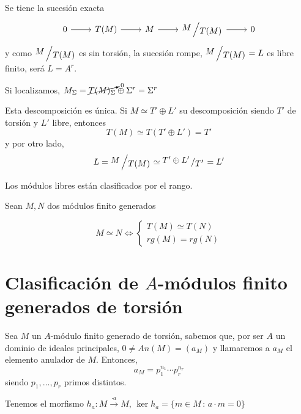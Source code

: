 \begin{dem}
    Se tiene la sucesi\'on exacta
    $$\bt 0 \rar & T(M) \rar & M \rar & \modulo{M}{T(M)} \rar & 0 \et$$
    y como $\modulo{M}{T(M)}$ es sin torsi\'on, la sucesi\'on rompe, $\modulo{M}{T(M)} = L$ es libre finito, ser\'a $L = A^r$.

    Si localizamos, $M_{\Sigma} = \cancelto{0}{T(M)_{\Sigma}} \oplus \Sigma^r  = \Sigma^r $

    Esta descomposición es única. Si $M\simeq T' \oplus L'$ su descomposici\'on siendo $T'$ de torsi\'on y $L'$ libre, entonces
    $$T(M) \simeq T(T'\oplus L') = T' $$
    y por otro lado, 
    $$L = \modulo{M}{T(M)} \simeq \modulo{T'\oplus L'}{T'} = L'$$
 \end{dem}
 \begin{obs}
 Los m\'odulos libres est\'an clasificados por el rango. 
 \end{obs}

Sean $M, N$ dos m\'odulos finito generados
 \begin{teo}
    [de clasificaci\'on] $$M \simeq N \iff \begin{cases}
        T(M) \simeq T(N)\\ rg(M) = rg(N)
    \end{cases}$$
 \end{teo}
 \section{Clasificaci\'on de $A$-m\'odulos finito generados de torsi\'on}
 Sea $M$ un $A$-m\'odulo finito generado de torsi\'on, sabemos que, por ser $A$ un dominio de ideales principales, $0 \neq An(M) = (a_M)$ y llamaremos a $a_M$ el elemento anulador de $M$. Entonces, 
 $$a_M = p_1^{n_1} \cdots p_r^{n_r}$$
 siendo $p_1, \ldots, p_r$ primos distintos. 

 Tenemos el morfismo $h_a : M \xrightarrow{\cdot a} M$, $\ker h_a = \{m \in M\, : 
 \, a\cdot m =0 \}$

